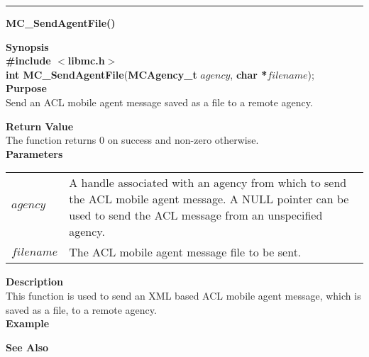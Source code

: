 \noindent
\vspace{5pt}
\rule{6.5in}{.01in}
\noindent
{\LARGE \bf MC\_SendAgentFile()}\\ 
{}
\label{api:MC_SendAgentFile()}

\noindent
{\bf Synopsis}\\
{\bf \#include $<$libmc.h$>$}\\
{\bf int MC\_SendAgentFile}({\bf MCAgency\_t} $agency$, {\bf char *}$filename$);\\

\noindent
{\bf Purpose}\\
Send an ACL mobile agent message saved as a file to a remote agency.

\noindent
{\bf Return Value}\\
The function returns 0 on success and non-zero otherwise.\\

\noindent
{\bf Parameters}
\vspace{-0.1in}
\begin{description}
\item
\begin{tabular}{p{20 mm}p{135 mm}}
$agency$ & A handle associated with an agency from which to send the ACL 
mobile agent message. A NULL pointer can be used to send the ACL message 
from an unspecified agency.\\ 
$filename$ & The ACL mobile agent message file to be sent.\\
\end{tabular}
\end{description}

\noindent
{\bf Description}\\
This function is used to send an XML based ACL mobile agent message, which 
is saved as a file, to a remote agency. \\

\noindent
{\bf Example}\\
\noindent
{\footnotesize}

\noindent
{\bf See Also}\\

